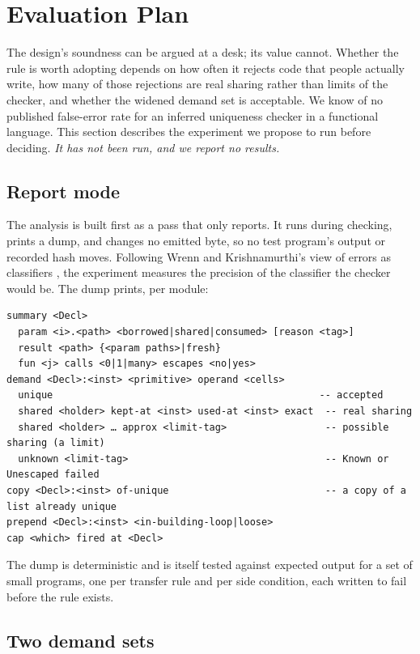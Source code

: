 \section{Evaluation Plan}
\label{sec:evaluation}

The design's soundness can be argued at a desk; its value cannot. Whether the rule is worth adopting
depends on how often it rejects code that people actually write, how many of those rejections are real
sharing rather than limits of the checker, and whether the widened demand set is acceptable. We know of
no published false-error rate for an inferred uniqueness checker in a functional language. This section
describes the experiment we propose to run before deciding. \emph{It has not been run, and we report no
results.}

\subsection{Report mode}

The analysis is built first as a pass that only reports. It runs during checking, prints a dump, and
changes no emitted byte, so no test program's output or recorded hash moves. Following Wrenn and
Krishnamurthi's view of errors as classifiers \citep{wrenn2017classifiers}, the experiment measures the
precision of the classifier the checker would be. The dump prints, per module:
\begin{Verbatim}
summary <Decl>
  param <i>.<path> <borrowed|shared|consumed> [reason <tag>]
  result <path> {<param paths>|fresh}
  fun <j> calls <0|1|many> escapes <no|yes>
demand <Decl>:<inst> <primitive> operand <cells>
  unique                                              -- accepted
  shared <holder> kept-at <inst> used-at <inst> exact  -- real sharing
  shared <holder> … approx <limit-tag>                 -- possible sharing (a limit)
  unknown <limit-tag>                                  -- Known or Unescaped failed
copy <Decl>:<inst> of-unique                           -- a copy of a list already unique
prepend <Decl>:<inst> <in-building-loop|loose>
cap <which> fired at <Decl>
\end{Verbatim}
The dump is deterministic and is itself tested against expected output for a set of small programs, one
per transfer rule and per side condition, each written to fail before the rule exists.

\subsection{Two demand sets}

